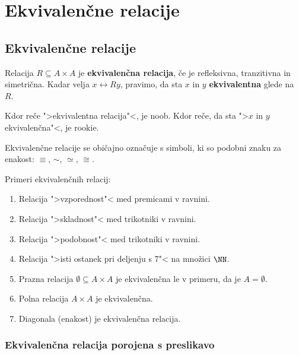 \chapter{Ekvivalenčne relacije}

\section{Ekvivalenčne relacije}

\begin{definicija}
  Relacija $R \subseteq A \times A$ je \textbf{ekvivalenčna relacija}, če je refleksivna, tranzitivna in simetrična. Kadar velja $x \rel{R} y$, pravimo, da sta $x$ in $y$ \textbf{ekvivalentna} glede na~$R$.
\end{definicija}

\begin{opomba}
  Kdor reče ">ekvivalentna relacija"<, je noob. Kdor reče, da sta ">$x$ in $y$
  ekvivalenčna"<, je rookie.
\end{opomba}

Ekvivalenčne relacije se običajno označuje s simboli, ki so podobni znaku za enakost:
$\equiv$, $\sim$, $\simeq$, $\cong$.

\begin{zgled}
  Primeri ekvivalenčnih relacij:
  \begin{enumerate}
    \item Relacija ">vzporednost"< med premicami v ravnini.
    \item Relacija ">skladnost"< med trikotniki v ravnini.
    \item Relacija ">podobnost"< med trikotniki v ravnini.
    \item Relacija ">isti ostanek pri deljenju s 7"< na množici $\NN$.
    \item Prazna relacija $\emptyset \subseteq A \times A$ je ekvivalenčna le v primeru, da je $A = \emptyset$.
    \item Polna relacija $A \times A$ je ekvivalenčna.
    \item Diagonala (enakost) je ekvivalenčna relacija.
  \end{enumerate}
\end{zgled}

\subsection{Ekvivalenčna relacija porojena s preslikavo}


